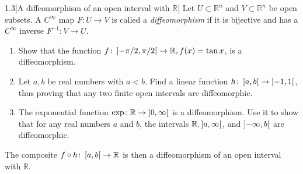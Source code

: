 \begin{problem}{1.3}[A diffeomorphism of an open interval with \(\mathbb{R}\)]
Let \(U\subset\mathbb{R}^{n}\) and \(V\subset\mathbb{R}^{n}\) be open subsets. A \(C^{\infty}\) map \(F\colon U\to V\) is called a \textit{diffeomorphism} if it is bijective and has a \(C^{\infty}\) inverse \(F^{-1}\colon V\to U\).
\begin{enumerate}[label={(\alph*)}]
	\item Show that the function \(f\colon\left]{-\pi/2,\pi/2}\right[\to\mathbb{R}, f(x)=\tan x\), is a diffeomorphism.
	\item Let \(a,b\) be real numbers with \(a<b\). Find a linear function \(h\colon\left]{a,b}\right[ \to \left]{-1,1}\right[\), thus proving that any two finite open intervals are diffeomorphic.
	\item The exponential function \(\exp\colon\mathbb{R}\to\left]{0,\infty}\right[\) is a diffeomorphism. Use it to show that for any real numbers \(a\) and \(b\), the intervals \(\mathbb{R}, \left]{a,\infty}\right[\), and \(\left]{-\infty,b}\right[\) are diffeomorphic.
\end{enumerate}

The composite \(f\circ h\colon\left[{a,b}\right[\to\mathbb{R}\) is then a diffeomorphism of an open interval with \(\mathbb{R}\).
\end{problem}

